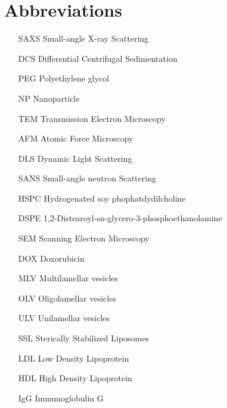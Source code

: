 \section*{Abbreviations}

\thispagestyle{empty}

\begin{itemize}
        \item   [SAXS] Small-angle X-ray Scattering
        \item   [DCS] Differential Centrifugal Sedimentation
        \item   [PEG] Polyethylene glycol
        \item   [NP] Nanoparticle
        \item   [TEM] Transmission Electron Microscopy
        \item   [AFM] Atomic Force Microscopy
        \item   [DLS] Dynamic Light Scattering
        \item   [SANS] Small-angle neutron Scattering
        \item   [HSPC] Hydrogenated soy phophatdydilcholine
        \item   [DSPE] 1,2-Distearoyl-sn-glycero-3-phosphoethanolamine
        \item   [SEM] Scanning Electron Microscopy
        \item   [DOX] Doxorubicin        
        \item   [MLV] Multilamellar vesicles
        \item   [OLV] Oligolamellar vesicles
        \item   [ULV] Unilamellar vesicles
        \item   [SSL] Sterically Stabilized Liposomes
        \item   [LDL] Low Density Lipoprotein
        \item   [HDL] High Density Lipoprotein
        \item   [IgG] Immunoglobulin G
        

\end{itemize}
